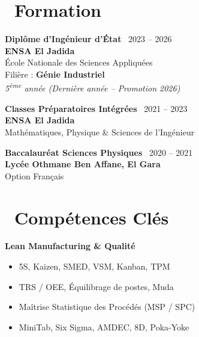 \documentclass[a4paper,9pt]{extarticle}
\def\faGraduationCap{}%
\def\faCubes{}%
\def\faCalendar*{}%
\newcommand{\cvhighlight}[1]{\textcolor{accentteal}{\textbf{#1}}}
\begin{document}
\begin{minipage}[t]{0.395\textwidth}

  \section{\faGraduationCap\ Formation}

  \textbf{\color{primary}\small Diplôme d'Ingénieur d'État} \hfill {\scriptsize\color{textmuted}\faCalendar*\ 2023 -- 2026}\\
  {\small \textbf{ENSA El Jadida}}\\
  {\footnotesize École Nationale des Sciences Appliquées}\\
  {\footnotesize Filière : \cvhighlight{Génie Industriel}}\\
  {\scriptsize\textit{5\textsuperscript{ème} année (Dernière année -- Promotion 2026)}}

  \vspace{1.5pt}

  \textbf{\color{primary}\small Classes Préparatoires Intégrées} \hfill {\scriptsize\color{textmuted}\faCalendar*\ 2021 -- 2023}\\
  {\small \textbf{ENSA El Jadida}}\\
  {\footnotesize Mathématiques, Physique \& Sciences de l'Ingénieur}

  \vspace{1.5pt}

  \textbf{\color{primary}\small Baccalauréat Sciences Physiques} \hfill {\scriptsize\color{textmuted}\faCalendar*\ 2020 -- 2021}\\
  {\small \textbf{Lycée Othmane Ben Affane, El Gara}}\\
  {\footnotesize Option Français}

  \vspace{2pt}

  \section{\faCubes\ Compétences Clés}

  {\footnotesize \textbf{\color{accent} Lean Manufacturing \& Qualité}}
  \begin{itemize}
    \item 5S, Kaizen, SMED, VSM, Kanban, TPM
    \item TRS / OEE, Équilibrage de postes, Muda
    \item Maîtrise Statistique des Procédés (MSP / SPC)
    \item MiniTab, Six Sigma, AMDEC, 8D, Poka-Yoke
  \end{itemize}


\end{minipage}
\end{document}
